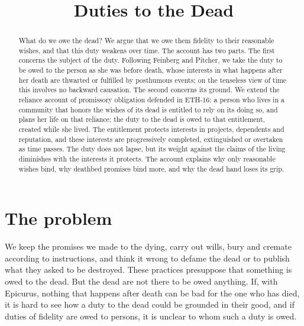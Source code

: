 \documentclass{situationist-preprint}
\title{Duties to the Dead}
\begin{document}
\maketitle

\begin{abstract}
What do we owe the dead? We argue that we owe them fidelity to their reasonable wishes, and that this duty weakens over time. The account has two parts. The first concerns the subject of the duty. Following Feinberg and Pitcher, we take the duty to be owed to the person as she was before death, whose interests in what happens after her death are thwarted or fulfilled by posthumous events; on the tenseless view of time this involves no backward causation. The second concerns its ground. We extend the reliance account of promissory obligation defended in ETH-16: a person who lives in a community that honors the wishes of its dead is entitled to rely on its doing so, and plans her life on that reliance; the duty to the dead is owed to that entitlement, created while she lived. The entitlement protects interests in projects, dependents and reputation, and these interests are progressively completed, extinguished or overtaken as time passes. The duty does not lapse, but its weight against the claims of the living diminishes with the interests it protects. The account explains why only reasonable wishes bind, why deathbed promises bind more, and why the dead hand loses its grip.
\end{abstract}

\section{The problem}

We keep the promises we made to the dying, carry out wills, bury and cremate according to instructions, and think it wrong to defame the dead or to publish what they asked to be destroyed. These practices presuppose that something is owed to the dead. But the dead are not there to be owed anything. If, with Epicurus, nothing that happens after death can be bad for the one who has died, it is hard to see how a duty to the dead could be grounded in their good, and if duties of fidelity are owed to persons, it is unclear to whom such a duty is owed.
\end{document}
